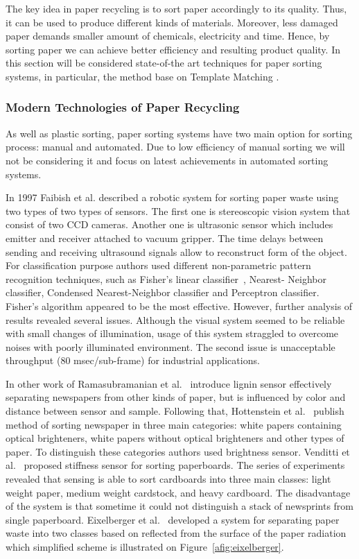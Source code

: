 \documentclass{lutmscthesis}[2010/09/22]
\begin{document}
The key idea in paper recycling is to sort
paper accordingly to its quality. Thus, it can
be used to produce different kinds of materials.
Moreover, less damaged paper demands smaller
amount of chemicals, electricity and time. Hence,
by sorting paper we can achieve better efficiency
and resulting product quality. In this section will be
considered state-of-the art techniques for paper sorting
systems, in particular, the method base on Template Matching
\cite{Rahman:2009}.

\subsubsection*{ Modern Technologies of Paper Recycling }
As well as plastic sorting, paper
sorting systems have two main option for sorting process: manual
and automated. Due to low efficiency of manual sorting we will not be considering
it and focus on latest achievements in automated sorting systems.

In 1997 Faibish et al. \cite{Faibish:1997} described a robotic system for sorting paper waste
using two types of two types of sensors. The first one is stereoscopic
vision system that consist of two CCD cameras. Another one is ultrasonic
sensor which includes emitter and receiver attached to vacuum gripper.
The time delays between sending and receiving ultrasound signals allow
to reconstruct form of the object. For classification
purpose authors used different non-parametric pattern recognition
techniques, such as Fisher's linear classifier~\cite{Fisher:1936}, Nearest- Neighbor
classifier, Condensed Nearest-Neighbor classifier and
Perceptron classifier. Fisher's algorithm appeared to be the most effective.
However, further analysis of results revealed several issues. Although
the visual system seemed to be reliable with small changes
of illumination, usage of this system straggled to overcome
noises with poorly illuminated environment. The second issue
is unacceptable throughput (80 msec/sub-frame) for industrial applications.

In other work of Ramasubramanian et al.~\cite{Ramasubramanian:2005} introduce lignin sensor
effectively separating newspapers from other kinds of paper,
but is influenced by color and distance between sensor and sample.
Following that, Hottenstein et al.~\cite{Friberg:2000} publish method of sorting
newspaper in three main categories: white papers containing optical brighteners,
white papers without optical brighteners and other types of paper. To distinguish
these categories authors used brightness sensor. Venditti et al.~\cite{Venditti:2007}
proposed stiffness sensor for sorting paperboards. The series of
experiments revealed that sensing is able to sort cardboards
into three main classes: light weight paper, medium weight cardstock,
and heavy cardboard. The disadvantage
of the system is that sometime it could not distinguish a stack
of newsprints from single paperboard. Eixelberger et al.~\cite{Eixelberger:2003} developed a system
for separating paper waste into two classes based on reflected
from the surface of the paper radiation which simplified scheme
is illustrated on Figure~\ref{afig:eixelberger}.
\end{document}
